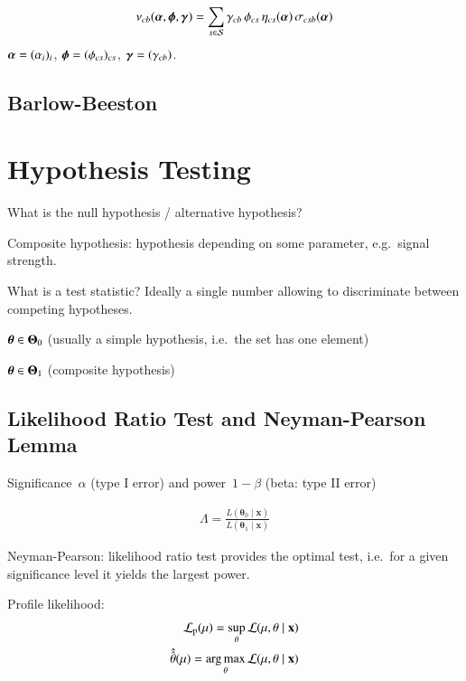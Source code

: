 \begin{align*}
  \nu_{cb}(\boldsymbol{\alpha}, \boldsymbol{\phi}, \boldsymbol{\gamma}) = \sum_{s \in \mathcal{S}} \gamma_{cb} \, \phi_{cs} \, \eta_{cs}(\boldsymbol{\alpha}) \, \sigma_{csb}(\boldsymbol{\alpha})
\end{align*}
$\boldsymbol{\alpha} = (\alpha_i)_i$, $\boldsymbol{\phi} = (\phi_{cs})_{cs}$,
$\boldsymbol{\gamma} = (\gamma_{cb})$.




\subsection{Barlow-Beeston}

\cite{barlow1993,conway2011}


\section{Hypothesis Testing}

What is the null hypothesis / alternative hypothesis?

Composite hypothesis: hypothesis depending on some parameter, e.g.\
signal strength.

What is a test statistic? Ideally a single number allowing to
discriminate between competing hypotheses.


$\boldsymbol{\theta} \in \boldsymbol{\Theta}_0$ (usually a simple hypothesis,
i.e.\ the set has one element)

$\boldsymbol{\theta} \in \boldsymbol{\Theta}_1$ (composite hypothesis)



\subsection{Likelihood Ratio Test and Neyman-Pearson Lemma}


Significance~$\alpha$ (type I error) and power~$1 - \beta$ (beta: type II error)

\begin{align*}
  \Lambda = \frac{L(\boldsymbol{\theta}_0 \mid \mathbf{x})}{L(\boldsymbol{\theta}_1 \mid \mathbf{x})}
\end{align*}

Neyman-Pearson: likelihood ratio test provides the optimal test, i.e.\
for a given significance level it yields the largest power.


Profile likelihood:
\begin{align*}
  \mathcal{L}_\text{p}(\mu) = \sup_\theta \mathcal{L}(\mu, \theta \mid \mathbf{x}) \\
  \hat{\hat{\theta}}(\mu) = \operatorname*{arg\,max}_\theta \mathcal{L}(\mu, \theta \mid \mathbf{x})
\end{align*}

